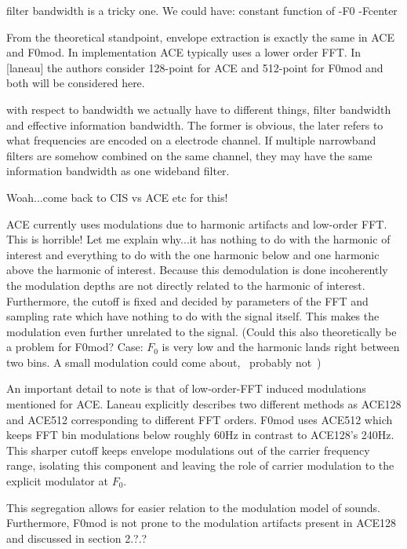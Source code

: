 \documentclass [11pt, proquest] {uwthesis}[2015/03/03]
\begin{document}
filter bandwidth is a tricky one.  We could have:
constant
function of
-F0
-Fcenter

From the theoretical standpoint, envelope extraction is exactly the same in ACE and F0mod.  In implementation ACE typically uses a lower order FFT.  In [laneau] the authors consider 128-point for ACE and 512-point for F0mod and both will be considered here.



        with respect to bandwidth we actually have to different things, filter bandwidth and effective information bandwidth.  The former is obvious, the later refers to what frequencies are encoded on a electrode channel.  If multiple narrowband filters are somehow combined on the same channel, they may have the same information bandwidth as one wideband filter.





Woah...come back to CIS vs ACE etc for this!

ACE currently uses modulations due to harmonic artifacts and low-order FFT.  This is horrible!  Let me explain why...it has nothing to do with the harmonic of interest and everything to do with the one harmonic below and one harmonic above the harmonic of interest.  Because this demodulation is done incoherently the modulation depths are not directly related to the harmonic of interest.  Furthermore, the cutoff is fixed and decided by parameters of the FFT and sampling rate which have nothing to do with the signal itself.  This makes the modulation even further unrelated to the signal.  (Could this also theoretically be a problem for F0mod?  Case: $F_0$ is very low and the harmonic lands right between two bins.  A small modulation could come about, ~probably not~)

An important detail to note is that of low-order-FFT induced modulations mentioned for ACE.  Laneau explicitly describes two different methods as ACE128 and ACE512 corresponding to different FFT orders.  F0mod uses ACE512 which keeps FFT bin modulations below roughly 60Hz in contrast to ACE128's 240Hz.  This sharper cutoff keeps envelope modulations out of the carrier frequency range, isolating this component and leaving the role of carrier modulation to the explicit modulator at $F_0$.

This segregation allows for easier relation to the modulation model of sounds.  Furthermore, F0mod is not prone to the modulation artifacts present in ACE128 and discussed in section 2.?.?
\end{document}
